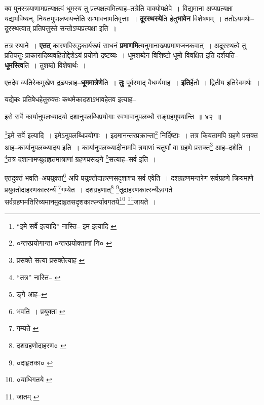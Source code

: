 \documentclass[article,12pt,a4paper]{memoir}
\begin{document}
	  \pstart क्व पुनस्त्रयाणामप्रत्यक्षत्वं धूमस्य तु प्रत्यक्षत्वमित्याह--तत्रेति वाक्योपक्षेपे । विद्यमाना अप्यप्रत्यक्षा यद्यभविष्यन्, नियतमुपालप्स्यन्तेति सम्भावनामतिवृत्ताः । \textbf{दूरस्थस्ये}ति हेतु\textbf{भावेन} विशेषणम् । ततोऽयमर्थः--दूरस्थत्वात् प्रतिपत्तुस्ते सन्तोऽप्यप्रत्यक्षा इति ।
	\pend
      

	  \pstart तत्र स्थाने । \textbf{एतत्} कारणविरुद्धकार्यरूपं साधनं \textbf{प्रमाणमि}त्यनुमानाख्यप्रमाणजनकवात् । अदूरस्थत्वे तु प्रतिपत्तुः प्राकारादिव्यवहितोद्देशेऽयं प्रयोगो द्रष्टव्यः । धूमशब्देन विशिष्टो धूमो विवक्षित इति दर्शयति--\textbf{धूमस्त्वि}ति । तुशब्दो विशेषार्थः ।
	\pend
      

	  \pstart एतदेव व्यतिरेकमुखेण द्रढयन्नाह--\textbf{धूममात्रेणे}ति । \textbf{तुः} पूर्वस्माद् वैधर्म्यमाह । \textbf{इति}र्हेतौ । द्वितीय इतिरेवमर्थः ।
	\pend
      \leavevmode{}
	  \bigskip
	  \begingroup
	

	  \pstart यद्येकः प्रतिषेधहेतुरुक्तः कथमेकादशाऽभावहेतव इत्याह--
	\pend
       
	  \bigskip
	  \begingroup
	

	  \pstart इसे सर्वे कार्यानुपलध्यादयो दशानुपलब्धिप्रयोगाः स्वभावानुपलब्धौ सङ्ग्रहमुपयान्ति ॥ ४२ ॥
	\pend
      
	  \endgroup
	 

	  \pstart \footnote{“इमे सर्वे इत्यादि” नास्ति--\cite{dp-edH} \cite{dp-edN} इम इत्यादि \cite{dp-msA} \cite{dp-msB} \cite{dp-msD} \cite{dp-edE} \cite{dp-edP}}इमे सर्वे इत्यादि । इमेऽनुपलब्धिप्रयोगाः । इदमानन्तरप्रक्रान्ता\footnote{०न्तरप्रयोगान्ता \cite{dp-edH} \cite{dp-edE} ०न्तरप्रयोक्तानां नि० \cite{dp-msA}} निर्दिष्टाः । तत्र कियतामपि ग्रहणे प्रसक्त आह--कार्यानुपलब्ध्यादय इति । कार्यानुपलब्ध्यादीनामपि त्रयाणां चतुर्णां वा ग्रहणे प्रसक्त\footnote{प्रसक्ते सत्या \cite{dp-edP} \cite{dp-edH} \cite{dp-edE} \cite{dp-edN} प्रसक्तेत्याह \cite{dp-msA}} आह--दशेति । \footnote{“तत्र” नास्ति--\cite{dp-msA} \cite{dp-msB} \cite{dp-edP} \cite{dp-edH} \cite{dp-edE} \cite{dp-edN}}तत्र दशानामप्युदाहृतमात्राणां ग्रहणप्रसङ्गे \footnote{ङ्गे आह--\cite{dp-msB}}सत्याह--सर्व इति ।
	\pend
       

	  \pstart एतदुक्तं भवति--अप्रयुक्ता\footnote{भवति । प्रयुक्ता \cite{dp-msC}} अपि प्रयुक्तोदाहरणसदृशाश्च सर्व एवेति । दशग्रहणमन्तरेण सर्वग्रहणे क्रियमाणे प्रयुक्तोदाहरणकार्त्स्न्यं \footnote{गम्यते \cite{dp-msA} \cite{dp-msB} \cite{dp-msC} \cite{dp-msD} \cite{dp-edP} \cite{dp-edH} \cite{dp-edE} \cite{dp-edN}}गम्येत । दशग्रहणात्\footnote{दशग्रहणोदाहरण० \cite{dp-msB}} \footnote{०दाहृतका० \cite{dp-msC}}तूदाहरणकार्त्स्न्येऽवगते सर्वग्रहणमतिरिच्यमानमुदाहृतसदृशकार्त्स्न्यावगतये\footnote{०याधिगतये \cite{dp-msC}} \footnote{जातम् \cite{dp-edE}}जायते ।
	\pend
      
\end{document}
